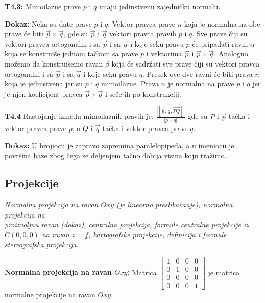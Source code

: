 \documentclass[12pt]{article}
\newcommand{\vek}[1]{\overrightarrow{#1}}
\begin{document}
\textbf{T4.3:} Mimoilazne prave $p$ i $q$ imaju jedinstvenu zajedničku normalu.
\par
\textbf{Dokaz:} Neka su date prave $p$ i $q$. Vektor pravca prave $n$ koja je
normalna na obe prave će biti $\vek{p}\times\vek{q}$, gde su $\vek{p}$ i
$\vek{q}$ vektori pravca pravih $p$ i $q$. Sve prave čiji su vektori pravca
ortogonalni i sa $\vek{p}$ i sa $\vek{q}$ i koje seku pravu $p$ će pripadati
ravni $\alpha$ koja se konstruiše jednom tačkom sa prave $p$ i vektorima
$\vek{p}$ i $\vek{p}\times\vek{q}$. Analogno možemo da konstruišemo ravan
$\beta$ koja će sadržati sve prave čiji su vektori pravca ortogonalni i sa
$\vek{p}$ i sa $\vek{q}$ i koje seku pravu $q$. Presek ove dve ravni će biti
prava $n$ koja je jedinstvena jer su $p$ i $q$ mimoilazne. Prava $n$ je
normalna na prave $p$ i $q$ jer je njen koeficijent pravca
$\vek{p}\times\vek{q}$ i seče ih po konstrukciji.
\par

\textbf{T4.4} Rastojanje između mimoilaznih pravih je:
$\frac{|[\vek{p},\vek{q},\vek{PQ}]|}{|p\times q|}$ gde su $P$ i $\vek{p}$ tačka
i vektor pravca prave $p$, a $Q$ i $\vek{q}$ tačka i vektor pravca prave $q$.
\par
\textbf{Dokaz:} U brojiocu je zapravo zapremina paralelopipeda, a u imeniocu je
površina baze zbog čega se deljenjem tačno dobija visina koju tražimo.
\par

\subsection{Projekcije}
\textit{Normalna projekcija na ravan $Oxy$ (je linearno preslikavanje),
    normalna projekcija na\\proizvoljnu ravan (dokaz), centralna projekcija, formule
    centralne projekcije iz $C(0,0,0)$ na ravan $z=f$, kartografske projekcije,
    definicija i formule stereografska projekcija.}
\par
\vspace*{1cm}

\textbf{Normalna projekcija na ravan $Oxy$:} Matrica $\begin{bmatrix}
        1 & 0 & 0 & 0 \\
        0 & 1 & 0 & 0 \\
        0 & 0 & 0 & 0 \\
        0 & 0 & 0 & 1
    \end{bmatrix}$ je matrica normalne projekcije na ravan $Oxy$.
\par
\end{document}
